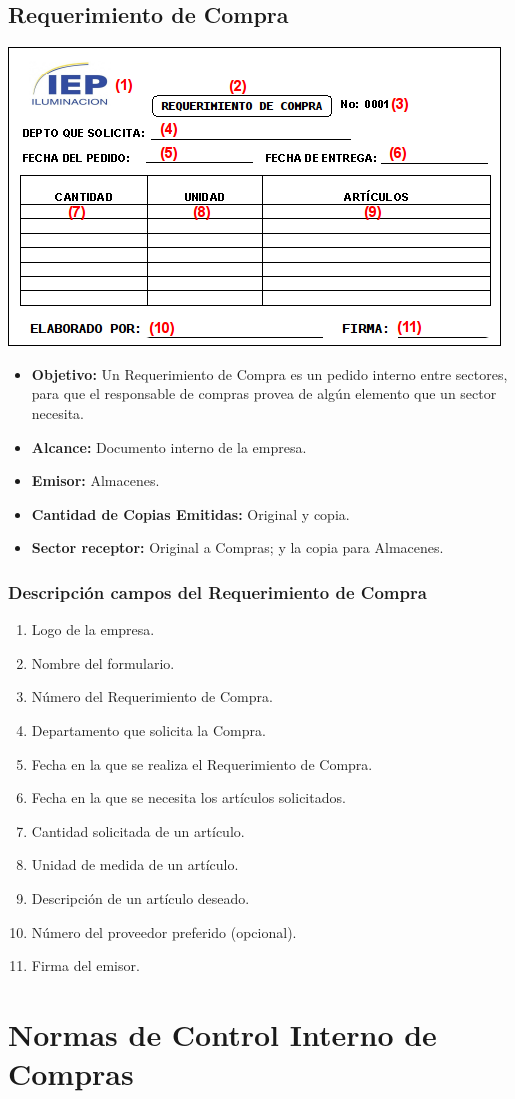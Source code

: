 \pagebreak
\subsection{Requerimiento de Compra}
\begin{center}
 \includegraphics{Images/FormulariosIEP/Requerimiento-de-Compra.png}
\end{center}

\begin{itemize}
  \item \textbf{Objetivo:} Un Requerimiento de Compra es un pedido interno entre sectores, para que el responsable de compras provea de algún elemento que un sector necesita.
  \item \textbf{Alcance:} Documento interno de la empresa.
  \item \textbf{Emisor:} Almacenes.
  \item \textbf{Cantidad de Copias Emitidas:} Original y copia.
  \item \textbf{Sector receptor:} Original a Compras; y la copia para Almacenes.
 \end{itemize}
\subsubsection{Descripci\'on campos del Requerimiento de Compra}
\begin{enumerate}
 \item Logo de la empresa.
 \item Nombre del formulario.
 \item N\'umero del Requerimiento de Compra.
 \item Departamento que solicita la Compra.
 \item Fecha en la que se realiza el Requerimiento de Compra.
 \item Fecha en la que se necesita los art\'iculos solicitados.
 \item Cantidad solicitada de un art\'iculo.
 \item Unidad de medida de un art\'iculo.
 \item Descripci\'on de un art\'iculo deseado.
 \item N\'umero del proveedor preferido (opcional).
 \item Firma del emisor.
\end{enumerate}


\pagebreak
\section{Normas de Control Interno de Compras}
